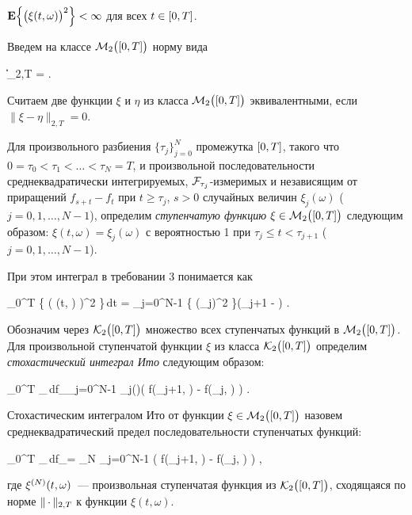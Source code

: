 	\item
		$\mathbf{E} \Bigl\{ \bigl( \xi(t, \omega) \bigr)^2 \Bigr\} < \infty$ для всех $t \in [0, T]$.
\eenum

Введем на классе $\mathcal{M}_2\bigl( [0, T] \bigr)$ норму вида

\beqn
	\| \xi \|_{2,T} =  \mbox{.}
\eeqn

Считаем две функции $\xi$ и $\eta$ из класса $\mathcal{M}_2\bigl( [0, T] \bigr)$ эквивалентными, если $\| \xi - \eta \|_{2,T} = 0$.

Для произвольного разбиения $\{ \tau_j \}_{j=0}^N$ промежутка $[0, T]$, такого что $0 = \tau_0 < \tau_1 < \ldots < \tau_N = T$, и произвольной последовательности среднеквадратически интегрируемых, $\mathcal{F}_{\tau_j}$-измеримых и независящим от приращений $f_{s+t} - f_t$ при $t \geqslant \tau_j$, $s > 0$ случайных величин $\xi_j(\omega)$ ($j = 0, 1, \ldots, N-1$), определим \emph{ступенчатую функцию} $\xi \in \mathcal{M}_2\bigl( [0, T] \bigr)$ следующим образом: $\xi(t, \omega) = \xi_j(\omega)$ с вероятностью 1 при $\tau_j \leqslant t < \tau_{j+1}$ ($j = 0, 1, \ldots, N-1$).

При этом интеграл в требовании 3 понимается как

\beqn
	\int\limits_0^T \E \Bigl\{ \bigl( \xi(t, \omega) \bigr)^2 \Bigr\}\,dt = \sum\limits_{j=0}^{N-1} \E \bigl\{ (\xi_j)^2 \bigr\}(\tau_{j+1} - ) \mbox{.}
\eeqn

Обозначим через $\mathcal{K}_2\bigl( [0, T] \bigr)$ множество всех ступенчатых функций в $\mathcal{M}_2\bigl( [0, T] \bigr)$. Для произвольной ступенчатой функции $\xi$ из класса $\mathcal{K}_2\bigl( [0, T] \bigr)$ определим \emph{стохастический интеграл Ито} следующим образом:

\beqn
	\int\limits_0^T \xi_\tau\,df_\tau \eqdef \sum\limits_{j=0}^{N-1} \xi_j(\omega)\bigl( f(\tau_{j+1}, \omega) - f(\tau_j, \omega) \bigr) \mbox{.}
\eeqn

\begin{df}
	Стохастическим интегралом Ито от функции $\xi \in \mathcal{M}_2\bigl( [0, T] \bigr)$ назовем среднеквадратический предел последовательности ступенчатых функций:
	
	\beqn
		\int\limits_0^T \xi_\tau\,df_\tau = \lim\limits_{N \to \infty} \sum\limits_{j=0}^{N-1} \xi{}\bigl( f(\tau{}_{j+1}, \omega) - f(\tau{}_j, \omega) \bigr) \mbox{,} 
	\eeqn
	
	где $\xi^{(N)}(t, \omega)$~--- произвольная ступенчатая функция из $\mathcal{K}_2\bigl( [0, T] \bigr)$, сходящаяся по норме $\| \,\cdotp \|_{2,T}$ к функции $\xi(t, \omega)$.
\end{df}

